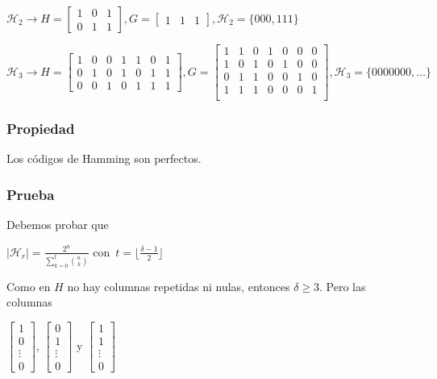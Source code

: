 \documentclass[10pt,a4paper]{article}
\begin{document}
$\mathcal{H}_2 \rightarrow H = \left[\begin{array}{cc|c}1& 0&1\\0&1&1 \end{array}\right], G = \left[\begin{array}{cc|c}1&1&1\end{array}\right], \mathcal{H}_2 = \{000, 111\}$

$\mathcal{H}_3 \rightarrow H = \left[ \begin{array}{ccc|cccc} 1& 0&0&1&1&0&1\\ 0& 1 & 0 & 1 & 0 & 1&1\\ 0 & 0 & 1 & 0 & 1 & 1 & 1 \end{array} \right], G = \left[ \begin{array}{ccc|cccc} 1&1&0&1&0&0&0\\ 1&0&1&0&1&0&0\\ 0&1&1&0&0&1&0\\ 1&1&1&0&0&0&1\\ \end{array} \right], \mathcal{H}_3 = \{0000000, \dots\}$

\subsubsection*{Propiedad}

Los códigos de Hamming son perfectos.

\subsubsection*{Prueba}

Debemos probar que

\begin{center}
$\lvert \mathcal{H}_r\rvert = \frac{2^n}{\sum\limits_{k=0}^t{n \choose k}}$ con $t = \lfloor \frac{\delta -1 }{2}\rfloor$
\end{center}

Como en $H$ no hay columnas repetidas ni nulas, entonces $\delta \geq 3$. Pero las columnas

\begin{center}
$\left[ \begin{array}{c} 1\\ 0\\ \vdots\\ 0 \end{array} \right]$, $\left[ \begin{array}{c} 0\\ 1\\ \vdots\\ 0 \end{array} \right]$ y $\left[ \begin{array}{c} 1\\ 1\\ \vdots\\ 0 \end{array} \right]$
\end{center}
\end{document}
